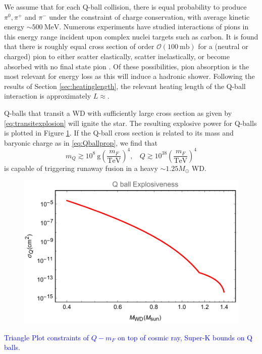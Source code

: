 \documentclass[twocolumn,showpacs,preprintnumbers,amsmath,amssymb,prd]{revtex4}
\newcommand{\OO}{\mathcal{O}}
\def\r{\right)}
\def\l{\left(}
\begin{document}
We assume that for each Q-ball collision, there is equal probability to produce $\pi^0, \pi^+$ and $\pi^-$ under the constraint of charge conservation, with average kinetic energy $\sim 500 ~\text{MeV}$. Numerous experiments have studied interactions of pions in this energy range incident upon complex nuclei targets such as carbon. It is found that there is roughly equal cross section of order $\OO (100 ~\text{mb})$ for a (neutral or charged) pion to either scatter elastically, scatter inelastically, or become absorbed with no final state pion \cite{Pionnuclear}. Of these possibilities, pion absorption is the most relevant for energy loss as this will induce a hadronic shower. Following the results of Section \ref{sec:heatinglength}, the relevant heating length of the Q-ball interaction is approximately $L \approx$.

Q-balls that transit a WD with sufficiently large cross section as given by \eqref{eq:transitexplosion} will ignite the star. The resulting explosive power for Q-balls is plotted in Figure \ref{fig:boomQball}. If the Q-ball cross section is related to its mass and baryonic charge as in \eqref{eq:Qballprop}, we find that
\begin{equation}
m_Q \gtrsim 10^8 ~\text{g} \l\frac{m_F}{\text{TeV}}\r^4, ~~~~ Q \gtrsim 10^{38} \l\frac{m_F}{\text{TeV}}\r^4
\end{equation}
is capable of triggering runaway fusion in a heavy $\sim 1.25 M_{\odot}$ WD.

\begin{figure}
\label{fig:boomQball}
\includegraphics[scale=.45]{boomQball.pdf}
\end{figure}

\textcolor{blue}{Triangle Plot constraints of $Q - m_F$ on top of cosmic ray, Super-K bounds on Q balls}.
\end{document}
